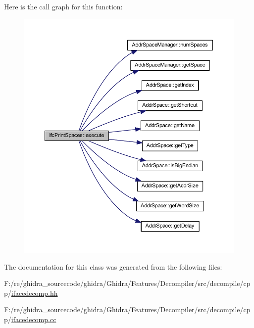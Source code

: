 Here is the call graph for this function\+:
\nopagebreak
\begin{figure}[H]
\begin{center}
\leavevmode
\includegraphics[width=350pt]{class_ifc_print_spaces_abc642427774b3e8e43054975ac5bf775_cgraph}
\end{center}
\end{figure}


The documentation for this class was generated from the following files\+:\begin{DoxyCompactItemize}
\item 
F\+:/re/ghidra\+\_\+sourcecode/ghidra/\+Ghidra/\+Features/\+Decompiler/src/decompile/cpp/\mbox{\hyperlink{ifacedecomp_8hh}{ifacedecomp.\+hh}}\item 
F\+:/re/ghidra\+\_\+sourcecode/ghidra/\+Ghidra/\+Features/\+Decompiler/src/decompile/cpp/\mbox{\hyperlink{ifacedecomp_8cc}{ifacedecomp.\+cc}}\end{DoxyCompactItemize}
